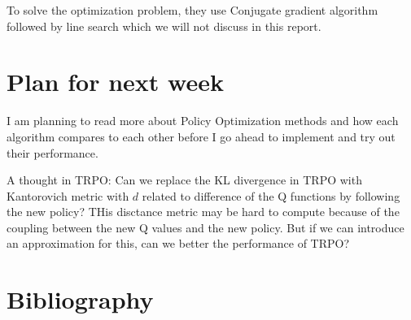 \documentclass{article}[11pt]
\begin{document}
To solve the optimization problem, they use Conjugate gradient algorithm followed by line search which we will not discuss in this report.


\section{Plan for next week}
I am planning to read more about Policy Optimization methods and how each algorithm compares to each other before I go ahead to implement and try out their performance. 

A thought in TRPO: Can we replace the KL divergence in TRPO with Kantorovich metric with $d$ related to difference of the Q functions by following the new policy? THis disctance metric may be hard to compute because of the coupling between the new Q values and the new policy. But if we can introduce an approximation for this, can we better the performance of TRPO?


\section{Bibliography}



\end{document}
